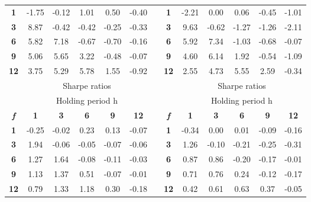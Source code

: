 \documentclass{article}
\begin{document}
\begin{table}[htbp]
\begin{tabular}{ccccccccccccc}
\cmidrule{2-6}\cmidrule{9-13}    \textbf{1} & -1.75 & -0.12 & 1.01  & 0.50  & -0.40 &       & \textbf{1} & -2.21 & 0.00  & 0.06  & -0.45 & -1.01 \\
    \textbf{3} & 8.87  & -0.42 & -0.42 & -0.25 & -0.33 &       & \textbf{3} & 9.63  & -0.62 & -1.27 & -1.26 & -2.11 \\
    \textbf{6} & 5.82  & 7.18  & -0.67 & -0.70 & -0.16 &       & \textbf{6} & 5.92  & 7.34  & -1.03 & -0.68 & -0.07 \\
    \textbf{9} & 5.06  & 5.65  & 3.22  & -0.48 & -0.07 &       & \textbf{9} & 4.60  & 6.14  & 1.92  & -0.54 & -1.09 \\
    \textbf{12} & 3.75  & 5.29  & 5.78  & 1.55  & -0.92 &       & \textbf{12} & 2.55  & 4.73  & 5.55  & 2.59  & -0.34 \\
    \midrule
          & \multicolumn{5}{c}{Sharpe ratios}     &       &       & \multicolumn{5}{c}{Sharpe ratios} \\
    \midrule
          & \multicolumn{5}{c}{Holding period h}  &       &       & \multicolumn{5}{c}{Holding period h} \\
    \textit{\textbf{f}} & \textbf{1} & \textbf{3} & \textbf{6} & \textbf{9} & \textbf{12} &       & \textit{\textbf{f}} & \textbf{1} & \textbf{3} & \textbf{6} & \textbf{9} & \textbf{12} \\
\cmidrule{2-6}\cmidrule{9-13}    \textbf{1} & -0.25 & -0.02 & 0.23  & 0.13  & -0.07 &       & \textbf{1} & -0.34 & 0.00  & 0.01  & -0.09 & -0.16 \\
    \textbf{3} & 1.94  & -0.06 & -0.05 & -0.07 & -0.06 &       & \textbf{3} & 1.26  & -0.10 & -0.21 & -0.25 & -0.31 \\
    \textbf{6} & 1.27  & 1.64  & -0.08 & -0.11 & -0.03 &       & \textbf{6} & 0.87  & 0.86  & -0.20 & -0.17 & -0.01 \\
    \textbf{9} & 1.13  & 1.37  & 0.51  & -0.07 & -0.01 &       & \textbf{9} & 0.71  & 0.76  & 0.24  & -0.12 & -0.17 \\
    \textbf{12} & 0.79  & 1.33  & 1.18  & 0.30  & -0.18 &       & \textbf{12} & 0.42  & 0.61  & 0.63  & 0.37  & -0.05 \\
    \bottomrule
    \end{tabular}%
  \label{tab:addlabel}%
\end{table}%
\end{document}
